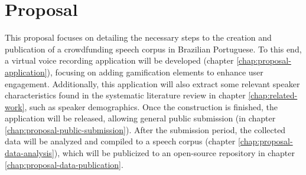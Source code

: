 \chapter[Proposal]{Proposal}
\label{chap:proposal}

This proposal focuses on detailing the necessary steps to the creation and publication of a crowdfunding speech corpus in Brazilian Portuguese. To this end, a virtual voice recording application will be developed (chapter \ref{chap:proposal-application}), focusing on adding gamification elements to enhance user engagement. Additionally, this application will also extract some relevant speaker characteristics found in the systematic literature review in chapter \ref{chap:related-work}, such as speaker demographics. Once the construction is finished, the application will be released, allowing general public submission (in chapter \ref{chap:proposal-public-submission}). After the submission period, the collected data will be analyzed and compiled to a speech corpus (chapter \ref{chap:proposal-data-analysis}), which will be publicized to an open-source repository in chapter \ref{chap:proposal-data-publication}.
